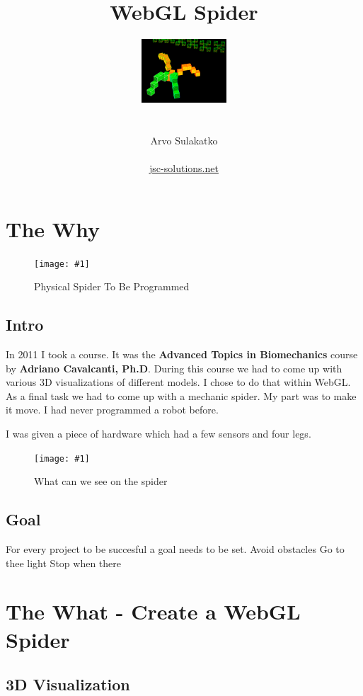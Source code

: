 \documentclass[12pt,leqno]{book}
\title{WebGL Spider}
\author{\includegraphics{../Design/Preview.png} \\ \\ \\ Arvo Sulakatko \\ \\ \href{http://www.jsc-solutions.net}{jsc-solutions.net} }
\newcommand{\png}[1]{\texttt{[image: \#1]}}
\newcommand{\figpng}[2]{\begin{figure}[H!tb]\centering\png{#1}\caption{#2}\end{figure}}
\begin{document}
\maketitle



\tableofcontents
\listoffigures


\chapter{The Why}

\figpng{Images/www.youtube.comvhKksAVmekAE_-_Google_Chrome-2012-03-14_16.27.22}
{Physical Spider To Be Programmed}




\section{Intro}

In 2011 I took a course. It was the \textbf{Advanced Topics in Biomechanics} course by \textbf{Adriano Cavalcanti, Ph.D}. During this course we had to come up with various 3D visualizations of different models. I chose to do that within WebGL. As a final task we had to come up with a mechanic spider. My part was to make it move. I had never programmed a robot before. 

I was given a piece of hardware which had a few sensors and four legs.

\figpng{Images/parts}
{What can we see on the spider}




\section{Goal}
For every project to be succesful a goal needs to be set. 
Avoid obstacles
Go to thee light
Stop when there






\chapter{The What - Create a WebGL Spider}
\section{3D Visualization}

\end{document}
